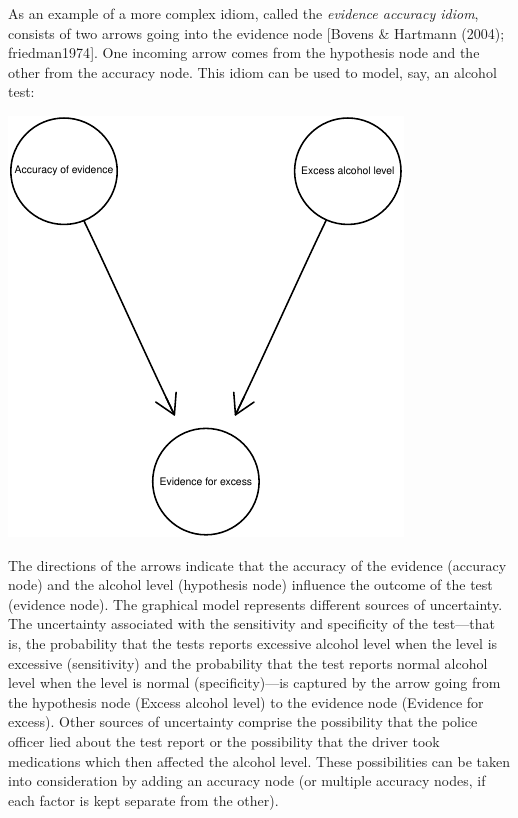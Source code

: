 \documentclass[11pt,dvipsnames,enabledeprecatedfontcommands]{scrartcl}
\begin{document}
As an example of a more complex idiom, called the
\emph{evidence accuracy
idiom}, consists of two arrows going into the evidence node {[}Bovens \&
Hartmann (2004); friedman1974{]}. One incoming arrow comes from the
hypothesis node and the other from the accuracy node. This idiom can be
used to model, say, an alcohol test:

\begin{center}\includegraphics{BNfiles/unnamed-chunk-7-1} \end{center}

\noindent The directions of the arrows indicate that the accuracy of the
evidence (accuracy node) and the alcohol level (hypothesis node)
influence the outcome of the test (evidence node). The graphical model
represents different sources of uncertainty. The uncertainty associated
with the sensitivity and specificity of the test---that is, the
probability that the tests reports excessive alcohol level when the
level is excessive (sensitivity) and the probability that the test
reports normal alcohol level when the level is normal (specificity)---is
captured by the arrow going from the hypothesis node
(\textsf{Excess alcohol level}) to the evidence node
(\textsf{Evidence for excess}). Other sources of uncertainty comprise
the possibility that the police officer lied about the test report or
the possibility that the driver took medications which then affected the
alcohol level. These possibilities can be taken into consideration by
adding an accuracy node (or multiple accuracy nodes, if each factor is
kept separate from the other).
\end{document}
